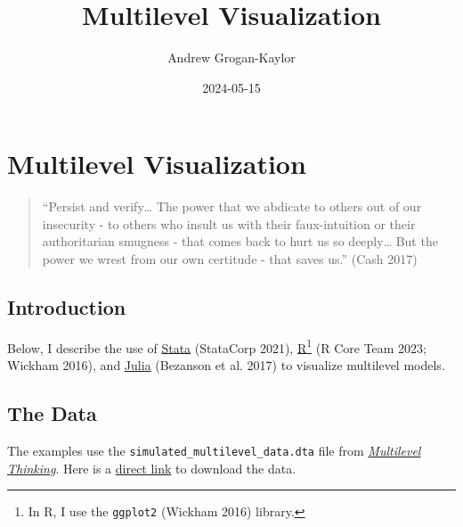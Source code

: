 \documentclass[
  letterpaper,
  DIV=11,
  numbers=noendperiod]{scrreprt}
\title{Multilevel Visualization}
\author{Andrew Grogan-Kaylor}
\date{2024-05-15}
\renewcommand*\contentsname{Table of contents}
\newcommand\contentsname{Table of contents}
\begin{document}
\maketitle

\renewcommand*\contentsname{Table of contents}
{
\hypersetup{linkcolor=}
\setcounter{tocdepth}{2}
\tableofcontents
}
\listoffigures
\listoftables
{}

\chapter{Multilevel Visualization}\label{multilevel-visualization}

\begin{quote}
``Persist and verify\ldots{} The power that we abdicate to others out of
our insecurity - to others who insult us with their faux-intuition or
their authoritarian smugness - that comes back to hurt us so
deeply\ldots{} But the power we wrest from our own certitude - that
saves us.'' (Cash 2017)
\end{quote}

\section{Introduction}\label{introduction}

Below, I describe the use of \href{https://www.stata.com/}{Stata}
(StataCorp 2021), \href{https://www.r-project.org/}{R}\footnote{In R, I
  use the \texttt{ggplot2} (Wickham 2016) library.} (R Core Team 2023;
Wickham 2016), and \href{https://www.julialang.org/}{Julia} (Bezanson et
al. 2017) to visualize multilevel models.

\section{The Data}\label{sec-data}

The examples use the \texttt{simulated\_multilevel\_data.dta} file from
\href{https://agrogan1.github.io/multilevel-thinking/simulated-multi-country-data.html}{\emph{Multilevel
Thinking}}. Here is a
\href{https://github.com/agrogan1/multilevel-multilingual/raw/main/simulated_multilevel_data.dta}{direct
link} to download the data.
\end{document}
